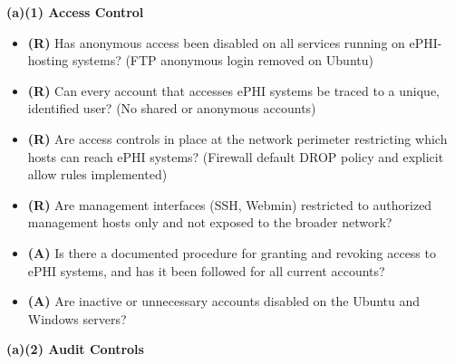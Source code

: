 \documentclass[12pt]{article}
\newcommand{\hipbadge}[2]{%
  \colorbox{#1}{\color{white}\textbf{\small #2}}%
}
\newcommand{\cbox}{\ding{113}\;}
\begin{document}
\bigskip
 
\noindent\hipbadge{acccol}{(a)(1) Access Control}
 
\begin{checklistbox}
\begin{itemize}[leftmargin=1.5em, label=\cbox, itemsep=4pt]
  \item \textbf{(R)} Has anonymous access been disabled on all services
    running on ePHI-hosting systems? (FTP anonymous login removed on Ubuntu)
  \item \textbf{(R)} Can every account that accesses ePHI systems be traced
    to a unique, identified user? (No shared or anonymous accounts)
  \item \textbf{(R)} Are access controls in place at the network perimeter
    restricting which hosts can reach ePHI systems? (Firewall default DROP
    policy and explicit allow rules implemented)
  \item \textbf{(R)} Are management interfaces (SSH, Webmin) restricted to
    authorized management hosts only and not exposed to the broader network?
  \item \textbf{(A)} Is there a documented procedure for granting and
    revoking access to ePHI systems, and has it been followed for all
    current accounts?
  \item \textbf{(A)} Are inactive or unnecessary accounts disabled on the
    Ubuntu and Windows servers?
\end{itemize}
\end{checklistbox}
 
\bigskip
 
\noindent\hipbadge{headercol}{(a)(2) Audit Controls}
 
\end{document}
